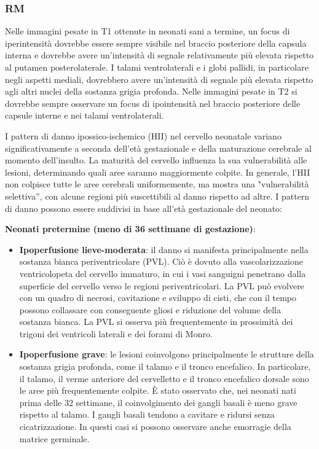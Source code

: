 \subsubsection{RM}
Nelle immagini pesate in T1 ottenute in neonati sani a termine, un focus di iperintensità dovrebbe essere sempre visibile nel braccio posteriore della capsula interna e dovrebbe avere un'intensità di segnale relativamente più elevata rispetto al putamen posterolaterale. I talami ventrolaterali e i globi pallidi, in particolare negli aspetti mediali, dovrebbero avere un'intensità di segnale più elevata rispetto agli altri nuclei della sostanza grigia profonda. Nelle immagini pesate in T2  si dovrebbe sempre osservare un focus di ipointensità nel braccio posteriore delle capsule interne e nei talami ventrolaterali.

I pattern di danno ipossico-ischemico (HII) nel cervello neonatale variano significativamente a seconda dell'età gestazionale e della maturazione cerebrale al momento dell'insulto. La maturità del cervello influenza la sua vulnerabilità alle lesioni, determinando quali aree saranno maggiormente colpite. In generale, l'HII non colpisce tutte le aree cerebrali uniformemente, ma mostra una "vulnerabilità selettiva'', con alcune regioni più suscettibili al danno rispetto ad altre. I pattern di danno possono essere suddivisi in base all'età gestazionale del neonato:

\textbf{Neonati pretermine (meno di 36 settimane di gestazione)}:

\begin{itemize}
	\tightlist
	\item
	\textbf{Ipoperfusione lieve-moderata}: il danno si manifesta principalmente nella sostanza bianca periventricolare (PVL). Ciò è dovuto alla vascolarizzazione ventricolopeta del cervello immaturo, in cui i vasi sanguigni penetrano dalla superficie del cervello verso le regioni periventricolari. La PVL può evolvere con un quadro di necrosi, cavitazione e sviluppo di cisti, che con il tempo possono collassare con conseguente gliosi e riduzione del volume della sostanza bianca. La PVL si osserva più frequentemente in prossimità dei trigoni dei ventricoli laterali e dei forami di Monro.
	\item
	\textbf{Ipoperfusione grave}: le lesioni coinvolgono principalmente le strutture della sostanza grigia profonda, come il talamo e il tronco encefalico. In particolare, il talamo, il verme anteriore del cervelletto e il tronco encefalico dorsale sono le aree più frequentemente colpite. È stato osservato che, nei neonati nati prima delle 32 settimane, il coinvolgimento dei gangli basali è meno grave rispetto al talamo. I gangli basali tendono a cavitare e ridursi senza cicatrizzazione. In questi casi si possono osservare anche emorragie della matrice germinale.
\end{itemize}

